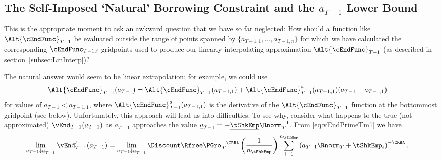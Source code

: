 \documentclass[titlepage]{\econtex}
\begin{document}
\hypertarget{The-Self-Imposed-Natural-Borrowing-Constraint-and-the-a-Lower-Bound}{}
\subsection{The Self-Imposed `Natural' Borrowing Constraint and the $a_{T-1}$ Lower Bound} \label{subsec:LiqConstrSelfImposed}


This is the appropriate moment to ask an awkward question that we have so far
neglected: How should a function like $\Alt{\cEndFunc}_{T-1}$
be evaluated outside the range of points spanned by
$\{{a}_{T-1,1},...,{a}_{T-1,n}\}$ for which we have calculated
the corresponding $\cEndFunc_{T-1,i}$ gridpoints used to produce our
linearly interpolating approximation $\Alt{\cEndFunc}_{T-1}$ (as described in section~\ref{subsec:LinInterp})?

The natural answer would seem to be linear extrapolation; for example, we could use
\begin{equation}\begin{gathered}\begin{aligned}
  \Alt{\cEndFunc}_{T-1}({a}_{T-1})  & = \Alt{\cEndFunc}_{T-1}({a}_{T-1,1})+\Alt{\cEndFunc}_{T-1}^{{a}}({a}_{T-1,1})({a}_{T-1}-{a}_{T-1,1}) \label{eq:ExtrapLin}
\end{aligned}\end{gathered}\end{equation}
for values of ${a}_{T-1} < {a}_{T-1,1}$, where $\Alt{\cEndFunc}_{T-1}^{{a}}({a}_{T-1,1})$ is the derivative of the $\Alt{\cEndFunc}_{T-1}$ function at the bottommost gridpoint (see below).  Unfortunately, this approach
will lead us into difficulties.  To see why, consider what
happens to the true (not approximated) $\vEnd_{T-1}({a}_{T-1})$ as
${a}_{T-1}$ approaches the value
$\underline{a}_{T-1}=-\underline{\tShkEmp}\Rnorm_{T}^{-1}$.  From
\eqref{eq:vEndPrimeTm1} we have
\begin{equation}\begin{gathered}\begin{aligned}
  \lim_{{a}_{T-1} \downarrow \underline{a}_{T-1}} \vEnd_{T-1}^{\prime}({a}_{T-1}) 
& =                                                                                         \lim_{{a}_{T-1} \downarrow \underline{a}_{T-1}} \Discount \Rfree \PGro_{T}^{-\CRRA} \left(\frac{1}{n_{\tShkEmp}}\right) \sum_{i=1}^{n_{\tShkEmp}} \left( {a}_{T-1} \Rnorm_{T}+ \tShkEmp_{i}\right)^{-\CRRA}.
\end{aligned}\end{gathered}\end{equation}
\end{document}
